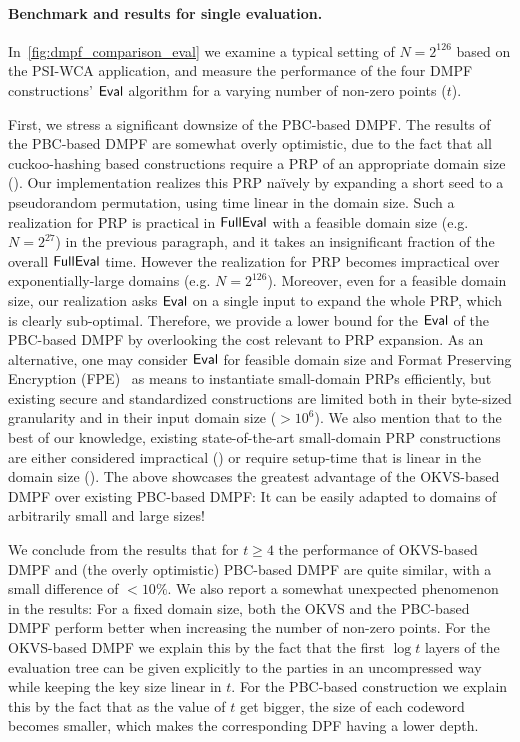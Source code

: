 

\paragraph{Benchmark and results for single evaluation.}
In~\cref{fig:dmpf_comparison_eval} we examine a typical setting of $N = 2^{126}$ based on the PSI-WCA application, and measure the performance of the four DMPF constructions' ${\sf Eval}$ algorithm for a varying number of non-zero points ($t$).

First, we stress a significant downsize of the PBC-based DMPF. The results of the PBC-based DMPF are somewhat overly optimistic, due to the fact that all cuckoo-hashing based constructions require a PRP of an appropriate domain size (\cite{cryptoeprint:2019/273,cryptoeprint:2019/1084,cryptoeprint:2021/580,foleage}). Our implementation realizes this PRP na\"ively by expanding a short seed to a pseudorandom permutation, using time linear in the domain size.
Such a realization for PRP is practical in ${\sf FullEval}$ with a feasible domain size (e.g. $N=2^{27}$) in the previous paragraph, and it takes an insignificant fraction of the overall ${\sf FullEval}$ time. However the realization for PRP becomes impractical over exponentially-large domains (e.g. $N=2^{126}$). Moreover, even for a feasible domain size, our realization asks ${\sf Eval}$ on a single input to expand the whole PRP, which is clearly sub-optimal.  
Therefore, we provide a lower bound for the ${\sf Eval}$ of the PBC-based DMPF by overlooking the cost relevant to PRP expansion.
As an alternative, one may consider ${\sf Eval}$ for feasible domain size and Format Preserving Encryption (FPE)~\cite{fpe} as means to instantiate small-domain PRPs efficiently, but existing secure and standardized constructions are limited both in their byte-sized granularity and in their input domain size ($>10^6$). 
We also mention that to the best of our knowledge, existing state-of-the-art small-domain PRP constructions are either considered impractical (\cite{sym_small_blocks}) or require setup-time that is linear in the domain size (\cite{stefanov2012fastprp}).
The above showcases the greatest advantage of the OKVS-based DMPF over existing PBC-based DMPF: It can be easily adapted to domains of arbitrarily small and large sizes!

We conclude from the results that for $t\geq 4$ the performance of OKVS-based DMPF and (the overly optimistic) PBC-based DMPF are quite similar, with a small difference of $<10\%$.
We also report a somewhat unexpected phenomenon in the results: For a fixed domain size, both the OKVS and the PBC-based DMPF perform better when increasing the number of non-zero points.
For the OKVS-based DMPF we explain this by the fact that the first $\log t$ layers of the evaluation tree can be given explicitly to the parties in an uncompressed way while keeping the key size linear in $t$.
For the PBC-based construction we explain this by the fact that as the value of $t$ get bigger, the size of each codeword becomes smaller, which makes the corresponding DPF having a lower depth.


